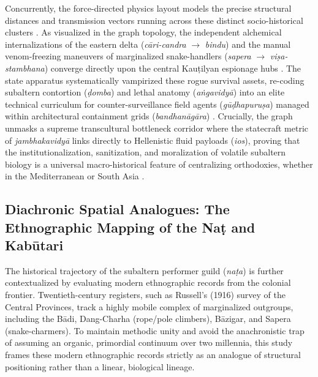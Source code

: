\documentclass[11pt,twoside,letterpaper]{article}
\begin{document}
Concurrently, the force-directed physics layout models the precise structural distances and transmission vectors running across these distinct socio-historical clusters \citep{Lorenzen2011}. As visualized in the graph topology, the independent alchemical internalizations of the eastern delta (\textit{cāri-candra} $\rightarrow$ \textit{bindu}) and the manual venom-freezing maneuvers of marginalized snake-handlers (\textit{sapera} $\rightarrow$ \textit{viṣa-stambhana}) converge directly upon the central Kauṭilyan espionage hubs \citep{Lorenzen2011, Mallinson2017}. The state apparatus systematically vampirized these rogue survival assets, re-coding subaltern contortion (\textit{ḍomba}) and lethal anatomy (\textit{aṅgavidyā}) into an elite technical curriculum for counter-surveillance field agents (\textit{gūḍhapuruṣa}) managed within architectural containment grids (\textit{bandhanāgāra}) \citep{McCartney2026}. Crucially, the graph unmasks a supreme transcultural bottleneck corridor where the statecraft metric of \textit{jambhakavidyā} links directly to Hellenistic fluid payloads (\textit{ios}), proving that the institutionalization, sanitization, and moralization of volatile subaltern biology is a universal macro-historical feature of centralizing orthodoxies, whether in the Mediterranean or South Asia \citep{Debnath2024, Lorenzen2011, McCartney2021}.

\subsection{Diachronic Spatial Analogues: The Ethnographic Mapping of the Naṭ and Kabūtari}
The historical trajectory of the subaltern performer guild (\textit{naṭa}) is further contextualized by evaluating modern ethnographic records from the colonial frontier. Twentieth-century registers, such as Russell’s (1916) survey of the Central Provinces, track a highly mobile complex of marginalized outgroups, including the Bādi, Dang-Charha (rope/pole climbers), Bāzigar, and Sapera (snake-charmers). To maintain methodic unity and avoid the anachronistic trap of assuming an organic, primordial continuum over two millennia, this study frames these modern ethnographic records strictly as an analogue of structural positioning rather than a linear, biological lineage.
\end{document}
